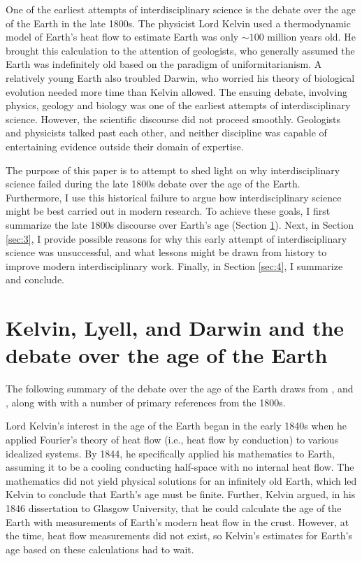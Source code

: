 \documentclass[12pt]{article}
\begin{document}
One of the earliest attempts of interdisciplinary science is the debate over the age of the Earth in the late 1800s. The physicist Lord Kelvin used a thermodynamic model of Earth's heat flow to estimate Earth was only $\sim 100$ million years old. He brought this calculation to the attention of geologists, who generally assumed the Earth was indefinitely old based on the paradigm of uniformitarianism. A relatively young Earth also troubled Darwin, who worried his theory of biological evolution needed more time than Kelvin allowed. The ensuing debate, involving physics, geology and biology was one of the earliest attempts of interdisciplinary science. However, the scientific discourse did not proceed smoothly. Geologists and physicists talked past each other, and neither discipline was capable of entertaining evidence outside their domain of expertise.

The purpose of this paper is to attempt to shed light on why interdisciplinary science failed during the late 1800s debate over the age of the Earth. Furthermore, I use this historical failure to argue how interdisciplinary science might be best carried out in modern research. To achieve these goals, I first summarize the late 1800s discourse over Earth's age (Section \ref{sec:2}). Next, in Section \ref{sec:3}, I provide possible reasons for why this early attempt of interdisciplinary science was unsuccessful, and what lessons might be drawn from history to improve modern interdisciplinary work. Finally, in Section \ref{sec:4}, I summarize and conclude.

\section{Kelvin, Lyell, and Darwin and the debate over the age of the Earth} \label{sec:2}

The following summary of the debate over the age of the Earth draws from \citet{Lindley_2004}, \citet{Gould_1987} and \citet{Hallam_1989}, along with with a number of primary references from the 1800s.

Lord Kelvin's interest in the age of the Earth began in the early 1840s when he applied Fourier's theory of heat flow (i.e., heat flow by conduction) to various idealized systems. By 1844, he specifically applied his mathematics to Earth, assuming it to be a cooling conducting half-space with no internal heat flow. The mathematics did not yield physical solutions for an infinitely old Earth, which led Kelvin to conclude that Earth's age must be finite. Further, Kelvin argued, in his 1846 dissertation to Glasgow University, that he could calculate the age of the Earth with measurements of Earth's modern heat flow in the crust. However, at the time, heat flow measurements did not exist, so Kelvin's estimates for Earth's age based on these calculations had to wait.
\end{document}
